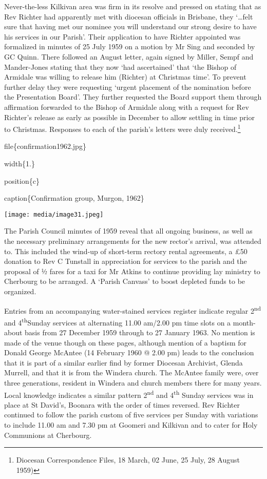Never-the-less Kilkivan area was firm in its resolve and pressed on stating that as Rev Richter had apparently met with diocesan officials in Brisbane, they `\ldots felt sure that having met our nominee you will understand our strong desire to have his services in our Parish'. Their application to have Richter appointed was formalized in minutes of 25 July 1959 on a motion by Mr Sing and seconded by GC Quinn. There followed an August letter, again signed by Miller, Sempf and Mander-Jones stating that they now `had ascertained' that `the Bishop of Armidale was willing to release him (Richter) at Christmas time'. To prevent further delay they were requesting `urgent placement of the nomination before the Presentation Board'. They further requested the Board support them through affirmation forwarded to the Bishop of Armidale along with a request for Rev Richter's release as early as possible in December to allow settling in time prior to Christmas. Responses to each of the parish's letters were duly received.\footnote{Diocesan Correspondence Files, 18 March, 02 June, 25 July, 28 August 1959)}

file\{confirmation1962.jpg\}

width\{1.\}

position\{c\}

caption\{Confirmation group, Murgon, 1962\}

\texttt{[image: media/image31.jpeg]}

The Parish Council minutes of 1959 reveal that all ongoing business, as well as the necessary preliminary arrangements for the new rector's arrival, was attended to. This included the wind-up of short-term rectory rental agreements, a £50 donation to Rev C Tunstall in appreciation for services to the parish and the proposal of ½ fares for a taxi for Mr Atkins to continue providing lay ministry to Cherbourg to be arranged. A `Parish Canvass' to boost depleted funds to be organized.

Entries from an accompanying water-stained services register indicate regular 2\textsuperscript{nd} and 4\textsuperscript{th}Sunday services at alternating 11.00 am/2.00 pm time slots on a month-about basis from 27 December 1959 through to 27 January 1963. No mention is made of the venue though on these pages, although mention of a baptism for Donald George McAntee (14 February 1960 @ 2.00 pm) leads to the conclusion that it is part of a similar earlier find by former Diocesan Archivist, Glenda Murrell, and that it is from the Windera church. The McAntee family were, over three generations, resident in Windera and church members there for many years. Local knowledge indicates a similar pattern 2\textsuperscript{nd} and 4\textsuperscript{th} Sunday services was in place at St David's, Boonara with the order of times reversed. Rev Richter continued to follow the parish custom of five services per Sunday with variations to include 11.00 am and 7.30 pm at Goomeri and Kilkivan and to cater for Holy Communions at Cherbourg.

